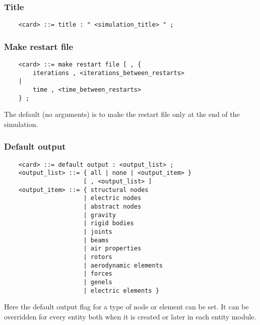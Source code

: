 \subsubsection{Title}
\begin{verbatim}
    <card> ::= title : " <simulation_title> " ;
\end{verbatim}

\subsubsection{Make restart file}
\begin{verbatim}
    <card> ::= make restart file [ , {
        iterations , <iterations_between_restarts>
    |
        time , <time_between_restarts>
    } ;    
\end{verbatim}
The default (no arguments) is to make the restart file only at the end of
the simulation.

\subsubsection{Default output}
\begin{verbatim}
    <card> ::= default output : <output_list> ;
    <output_list> ::= { all | none | <output_item> } 
                      [ , <output_list> ]
    <output_item> ::= { structural nodes
                      | electric nodes
                      | abstract nodes
                      | gravity
                      | rigid bodies
                      | joints
                      | beams
                      | air properties
                      | rotors
                      | aerodynamic elements
                      | forces
                      | genels
                      | electric elements }
\end{verbatim}
Here the default output flag for a type of node or element can be set. It
can be overridden for every entity both when it is created or later in
each entity module.






